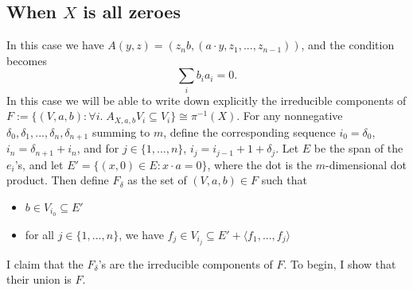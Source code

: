 \documentclass[12pt,psamsfonts]{article}
\begin{document}
\subsection{When \(X\) is all zeroes}
In this case we have \(A(y, z) = (z_n b, (a \cdot y, z_1, ..., z_{n - 1}))\), and the condition becomes
\[\sum_i b_i a_i = 0.\]
In this case we will be able to write down explicitly the irreducible components of \(F := \{(V, a, b) : \forall i. \; A_{X, a, b} V_i \subseteq V_i\} \cong \pi^{-1}(X)\).
For any nonnegative \(\delta_0, \delta_1, ..., \delta_n, \delta_{n + 1}\) summing to \(m\), define the corresponding sequence \(i_0 = \delta_0\), \(i_n = \delta_{n + 1} + i_n\), and for \(j \in \{1, ..., n\}\), \(i_j = i_{j - 1} + 1 + \delta_j\).
Let \(E\) be the span of the \(e_i\)'s, and let \(E' = \{(x, 0) \in E : x \cdot a = 0\}\), where the dot is the \(m\)-dimensional dot product.
Then define \(F_\delta\) as the set of \((V, a, b) \in F\) such that 
\begin{itemize}
    \item \(b \in V_{i_0} \subseteq E'\)
    \item for all \(j \in \{1, ..., n\}\), we have \(f_j \in V_{i_j} \subseteq E' + \langle f_1, ..., f_j \rangle\)
\end{itemize}
I claim that the \(F_\delta\)'s are the irreducible components of \(F\).
To begin, I show that their union is \(F\).
\end{document}
